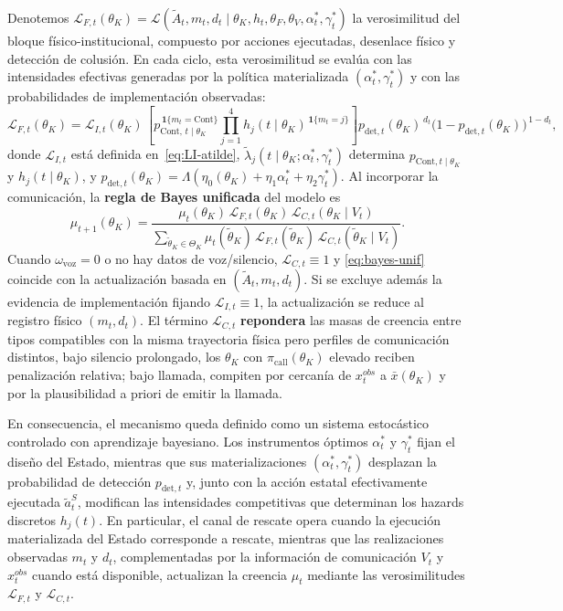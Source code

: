 \documentclass[12pt]{article}
\theoremstyle{definition}
\theoremstyle{remark}
\newcommand{\1}{\mathbf{1}}
\begin{document}
Denotemos $\mathcal{L}_{F,t}(\theta_K)=\mathcal{L}(\tilde A_t,m_t,d_t \mid \theta_K,h_t,\theta_F,\theta_V,\alpha_t^\ast,\gamma_t^\ast)$ la verosimilitud del bloque físico-institucional, compuesto por acciones ejecutadas, desenlace físico y detección de colusión. En cada ciclo, esta verosimilitud se evalúa con las intensidades efectivas generadas por la política materializada $(\alpha_t^\ast,\gamma_t^\ast)$ y con las probabilidades de implementación observadas:
\begin{equation}
\label{eq:LF-joint-opt}
\mathcal{L}_{F,t}(\theta_K)
=
\mathcal{L}_{I,t}(\theta_K)\,
\left[
p_{\mathrm{Cont},\,t\mid\theta_K}^{\,\mathbf{1}\{m_t=\mathrm{Cont}\}}
\prod_{j=1}^{4} h_j(t\mid\theta_K)^{\,\mathbf{1}\{m_t=j\}}
\right]
p_{\mathrm{det},t}(\theta_K)^{\,d_t}\bigl(1-p_{\mathrm{det},t}(\theta_K)\bigr)^{\,1-d_t},
\end{equation}
donde $\mathcal{L}_{I,t}$ está definida en~\eqref{eq:LI-atilde}, $\tilde{\lambda}_j(t\mid\theta_K;\alpha_t^\ast,\gamma_t^\ast)$ determina $p_{\mathrm{Cont},t\mid\theta_K}$ y $h_j(t\mid\theta_K)$, y $p_{\mathrm{det},t}(\theta_K)=\Lambda(\eta_0(\theta_K)+\eta_1\alpha_t^\ast+\eta_2\gamma_t^\ast)$. Al incorporar la comunicación, la \textbf{regla de Bayes unificada} del modelo es
\begin{equation}
\label{eq:bayes-unif}
\mu_{t+1}(\theta_K)
=
\frac{
\mu_t(\theta_K)\,
\mathcal{L}_{F,t}(\theta_K)\,
\mathcal{L}_{C,t}(\theta_K \mid V_t)
}{
\sum_{\tilde{\theta}_K\in\Theta_K}
\mu_t(\tilde{\theta}_K)\,
\mathcal{L}_{F,t}(\tilde{\theta}_K)\,
\mathcal{L}_{C,t}(\tilde{\theta}_K \mid V_t)
}.
\end{equation}
Cuando $\omega_{\mathrm{voz}}=0$ o no hay datos de voz/silencio, $\mathcal{L}_{C,t}\equiv 1$ y \eqref{eq:bayes-unif} coincide con la actualización basada en $(\tilde A_t,m_t,d_t)$. Si se excluye además la evidencia de implementación fijando $\mathcal{L}_{I,t}\equiv1$, la actualización se reduce al registro físico $(m_t,d_t)$. El término $\mathcal{L}_{C,t}$ \textbf{repondera} las masas de creencia entre tipos compatibles con la misma trayectoria física pero perfiles de comunicación distintos, bajo silencio prolongado, los $\theta_K$ con $\pi_{\mathrm{call}}(\theta_K)$ elevado reciben penalización relativa; bajo llamada, compiten por cercanía de $x_t^{obs}$ a $\bar{x}(\theta_K)$ y por la plausibilidad a priori de emitir la llamada.

En consecuencia, el mecanismo queda definido como un sistema estocástico controlado con aprendizaje bayesiano. Los instrumentos óptimos $\alpha_t^\ast$ y $\gamma_t^\ast$ fijan el diseño del Estado, mientras que sus materializaciones $(\alpha_t^\ast,\gamma_t^\ast)$ desplazan la probabilidad de detección $p_{\mathrm{det},t}$ y, junto con la acción estatal efectivamente ejecutada $\tilde{a}_t^S$, modifican las intensidades competitivas que determinan los hazards discretos $h_j(t)$. En particular, el canal de rescate opera cuando la ejecución materializada del Estado corresponde a rescate, mientras que las realizaciones observadas $m_t$ y $d_t$, complementadas por la información de comunicación $V_t$ y $x_t^{obs}$ cuando está disponible, actualizan la creencia $\mu_t$ mediante las verosimilitudes $\mathcal{L}_{F,t}$ y $\mathcal{L}_{C,t}$.
\end{document}
